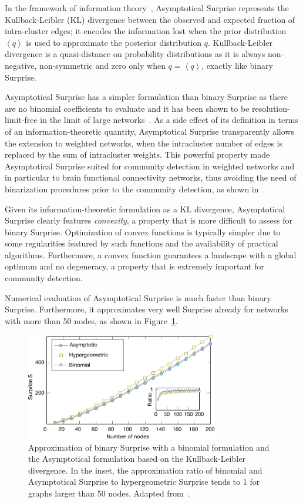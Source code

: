In the framework of information theory~\cite{cover2006}, Asymptotical Surprise represents the Kullback-Leibler (KL) divergence between the observed and expected fraction of intra-cluster edges; it encodes the information lost when the prior distribution $\left <q \right >$ is used to approximate the posterior distribution $q$.
Kullback-Leibler divergence is a quasi-distance on probability distributions as it is always non-negative, non-symmetric and zero only when $q=\left< q \right>$, exactly like binary Surprise.

Asymptotical Surprise has a simpler formulation than binary Surprise as there are no binomial coefficients to evaluate and it has been shown to be resolution-limit-free in the limit of large networks~\cite{traag2015}.
As a side effect of its definition in terms of an information-theoretic quantity, Asymptotical Surprise transparently allows the extension to weighted networks, when the intracluster number of edges is replaced by the sum of intracluster weights.
This powerful property made Asymptotical Surprise suited for community detection in weighted networks and in particular to brain functional connectivity networks, thus avoiding the need of binarization procedures prior to the community detection, as shown in~\cite{nicolini2017}.

Given its information-theoretic formulation as a KL divergence, Asymptotical Surprise clearly features \emph{convexity}, a property that is more difficult to assess for binary Surprise.
Optimization of convex functions is typically simpler due to some regularities featured by such functions and the availability of practical algorithms.
Furthermore, a convex function guarantees a landscape with a global optimum and no degeneracy, a property that is extremely important for community detection.

Numerical evaluation of Asymptotical Surprise is much faster than binary Surprise. Furthermore, it approximates very well Surprise already for networks with more than 50 nodes, as shown in Figure~\ref{fig:asymptotical_surprise_comparison}.

\begin{figure}[!htb]
\centering
\includegraphics[width=0.75\textwidth]{images/asymptotical_surprise_comparison.pdf}
\caption{Approximation of binary Surprise with a binomial formulation and the Asymptotical formulation based on the Kullback-Leibler divergence.
In the inset, the approximation ratio of binomial and Asymptotical Surprise to hypergeometric Surprise tends to 1 for graphs larger than 50 nodes.
Adapted from~\cite{traag2015}.}
\label{fig:asymptotical_surprise_comparison}
\end{figure}

